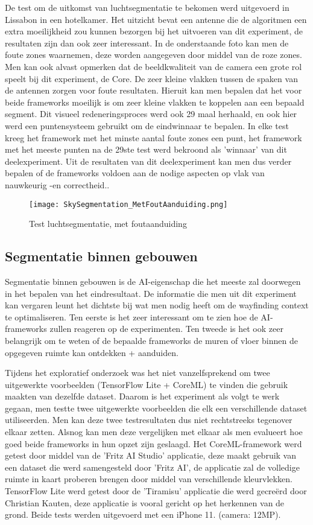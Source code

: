 De test om de uitkomst van luchtsegmentatie te bekomen werd uitgevoerd in Lissabon in een hotelkamer. Het uitzicht bevat een antenne die de algoritmen een extra moeilijkheid zou kunnen bezorgen bij het uitvoeren van dit experiment, de resultaten zijn dan ook zeer interessant. In de onderstaande foto kan men de foute zones waarnemen, deze worden  aangegeven door middel van de roze zones. Men kan ook alvast opmerken dat de beeldkwaliteit van de camera een grote rol speelt bij dit experiment, de Core. De zeer kleine vlakken tussen de spaken van de antennen zorgen voor foute resultaten. Hieruit kan men bepalen dat het voor beide frameworks moeilijk is om zeer kleine vlakken te koppelen aan een bepaald segment. Dit visueel redeneringsproces werd ook 29 maal herhaald, en ook hier werd een puntensysteem gebruikt om de eindwinnaar te bepalen. In elke test kreeg het framework met het minste aantal foute zones een punt, het framework met het meeste punten na de 29ste test werd bekroond als 'winnaar' van dit deelexperiment. Uit de resultaten van dit deelexperiment kan men dus verder bepalen of de frameworks voldoen aan de nodige aspecten op vlak van nauwkeurig -en correctheid..
\begin{figure}[H]
	\centering
	\texttt{[image: SkySegmentation\_MetFoutAanduiding.png]}
	\caption{Test luchtsegmentatie, met foutaanduiding}
\end{figure}


\subsection{Segmentatie binnen gebouwen}
Segmentatie binnen gebouwen is de AI-eigenschap die het meeste zal doorwegen in het bepalen van het eindresultaat. De informatie die men uit dit experiment kan vergaren leunt het dichtste bij wat men nodig heeft om de wayfinding context te optimaliseren. Ten eerste is het zeer interessant om te zien hoe de AI-frameworks zullen reageren op de experimenten. Ten tweede is het ook zeer belangrijk om te weten of de bepaalde frameworks de muren of vloer binnen de opgegeven ruimte kan ontdekken + aanduiden. 

Tijdens het exploratief onderzoek was het niet vanzelfsprekend om twee uitgewerkte voorbeelden (TensorFlow Lite + CoreML) te vinden die gebruik maakten van dezelfde dataset. Daarom is het  experiment als volgt te werk gegaan, men testte twee uitgewerkte voorbeelden die elk een verschillende dataset utiliseerden. Men kan deze twee testresultaten dus niet rechtstreeks tegenover elkaar zetten. Alsnog kan men deze vergelijken met elkaar als men evalueert hoe goed beide frameworks in hun opzet zijn geslaagd. Het CoreML-framework werd getest door middel van de 'Fritz AI Studio' applicatie, deze maakt gebruik van een dataset die werd samengesteld door 'Fritz AI', de applicatie zal de volledige ruimte in kaart proberen brengen door middel van verschillende kleurvlekken. TensorFlow Lite werd getest door de 'Tiramisu' applicatie die werd gecreërd door Christian Kauten, deze applicatie is vooral gericht op het herkennen van de grond. Beide tests werden uitgevoerd met een iPhone 11. (camera: 12MP). 

